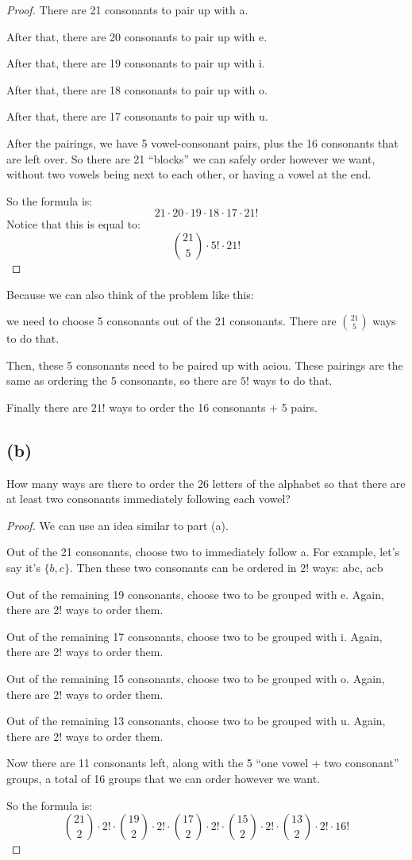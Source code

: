 \documentclass[14pt]{extarticle}
\begin{document}
\begin{proof}
There are 21 consonants to pair up with a.

After that, there are 20 consonants to pair up with e.

After that, there are 19 consonants to pair up with i.

After that, there are 18 consonants to pair up with o.

After that, there are 17 consonants to pair up with u.

After the pairings, we have 5 vowel-consonant pairs, plus the 16 consonants that are left over. So there are 21 ``blocks'' we can safely order however we want, without two vowels being next to each other, or having a vowel at the end.

So the formula is:
$$
21 \cdot 20 \cdot 19 \cdot 18 \cdot 17 \cdot 21!
$$
Notice that this is equal to:
$$
\binom{21}{5} \cdot 5! \cdot 21!
$$
\end{proof}
Because we can also think of the problem like this: 

we need to choose 5 consonants out of the 21 consonants. There are $\binom{21}{5}$ ways to do that. 

Then, these 5 consonants need to be paired up with aeiou. These pairings are the same as ordering the 5 consonants, so there are $5!$ ways to do that.

Finally there are $21!$ ways to order the 16 consonants + 5 pairs.
\subsection{(b)}
How many ways are there to order the 26 letters of the alphabet so that there are at least two consonants immediately following each vowel?
\begin{proof}
We can use an idea similar to part (a). 

Out of the 21 consonants, choose two to immediately follow a. For example, let's say it's $\{b,c\}$. Then these two consonants can be ordered in 2! ways: abc, acb

Out of the remaining 19 consonants, choose two to be grouped with e. Again, there are 2! ways to order them.

Out of the remaining 17 consonants, choose two to be grouped with i. Again, there are 2! ways to order them.

Out of the remaining 15 consonants, choose two to be grouped with o. Again, there are 2! ways to order them.

Out of the remaining 13 consonants, choose two to be grouped with u. Again, there are 2! ways to order them.

Now there are 11 consonants left, along with the 5 ``one vowel + two consonant'' groups, a total of 16 groups that we can order however we want.

So the formula is:
$$
\binom{21}{2}\cdot 2!\cdot\binom{19}{2}\cdot2!\cdot\binom{17}{2}\cdot2!\cdot\binom{15}{2}\cdot2!\cdot\binom{13}{2}\cdot 2!\cdot 16!
$$
\end{proof}
\end{document}
